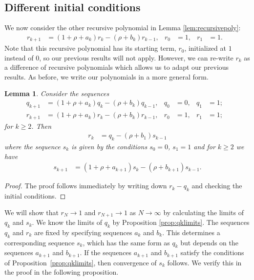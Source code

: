 \documentclass{amsart}
\newtheorem{lemma}{Lemma}
\theoremstyle{remark}
\theoremstyle{definition}
\begin{document}
\subsection{Different initial conditions}		

We now consider the other recursive polynomial in Lemma \ref{lem:recursivepoly}:
\begin{align*}
	r_{k+1} &= (1+\rho + a_{k})r_k -(\rho+b_k)r_{k-1}, & r_0&=1, & r_1&=1. &
\end{align*}
Note that this recursive polynomial has its starting term, $r_0$, initialized at $1$ instead of $0$, so our previous results will not apply. 
However, we can re-write $r_k$ as a difference of recursive polynomials which allows us to adapt our previous results.  
As before, we write our polynomials in a more general form.
\begin{lemma}\label{lem:r_kdiffeq}
	Consider the sequences 
	\begin{align*}
		q_{k+1} &= (1+\rho+a_k) q_k - (\rho+b_k)q_{k-1}, & q_0&=0, & q_1&=1; & \\
		r_{k+1} &= (1+\rho+a_k) r_k - (\rho+b_k)r_{k-1}, & r_0&=1, & r_1&=1; &
	\end{align*}
    for $k\geq 2$. 
	Then 
	\begin{align*}
		r_k &= q_k - (\rho +b_1)s_{k-1}
	\end{align*}
	where the sequence $s_k$ is given by the conditions $s_0=0$, $s_1 = 1$ and for $k\geq 2$ we have    
	\begin{align*}
		s_{k+1} &= (1+\rho+a_{k+1})s_k - (\rho+b_{k+1})s_{k-1}.
	\end{align*}
\end{lemma}

\begin{proof}
	The proof follows immediately by writing down $r_k-q_k$ and checking the initial conditions. 
\end{proof}
 We will show that $r_N\rightarrow 1$ and $r_{N+1}\rightarrow 1$ as $N\rightarrow\infty$ by calculating the limits of $q_k$ and $s_k$. 
We know the limits of $q_k$ by Proposition \ref{prop:qklimits}. 
The sequences $q_{k}$ and $r_{k}$ are fixed by specifying sequences $a_{k}$ and $b_{k}$. This determines a corresponding sequence $s_{k}$, which has the same form as $q_{k}$ but depends on the sequences $a_{k+1}$ and $b_{k+1}$. 
If the sequences $a_{k+1}$ and $b_{k+1}$ satisfy the conditions of Proposition~\ref{prop:qklimits}, then convergence of $s_{k}$ follows. 
We verify this in the proof in the following proposition.
\end{document}
